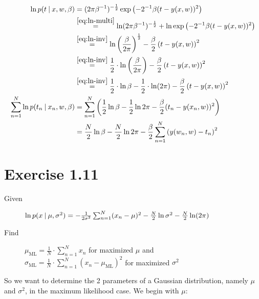 \documentclass[a4paper]{article}
\newcommand\given{
  \nonscript\:
  \vert
  \nonscript\:
  \mathopen{}
  \allowbreak
}
\begin{document}
\begin{align}
  \ln{p(t \given x,w,\beta)} &= (2 \pi \beta^{-1})^{-\frac12} \exp\left(-2^{-1} \beta (t - y(x,w))^2\right) \\
      &\overset{\eqref{eq:ln-multi}}{=} \ln(2 \pi \beta^{-1})^{-\frac12} + \ln\exp\left(-2^{-1} \beta (t - y(x,w))^2\right) \\
      &\overset{\eqref{eq:ln-inv}}{=} \ln\left(\frac{\beta}{2\pi}\right)^{\frac12} - \frac{\beta}{2}\left(t - y(x,w)\right)^2 \\
      &\overset{\eqref{eq:ln-inv}}{=} \frac12 \cdot \ln\left(\frac{\beta}{2\pi}\right) - \frac{\beta}{2}\left(t - y(x,w)\right)^2 \\
      &\overset{\eqref{eq:ln-inv}}{=} \frac12 \cdot \ln \beta - \frac12 \cdot \ln(2\pi) - \frac{\beta}{2}\left(t - y(x,w)\right)^2 \\
  \sum_{n=1}^N \ln{p(t_n \given x_n,w,\beta)} &= \sum_{n=1}^N \left(\frac12 \ln{\beta} - \frac12 \ln{2\pi} - \frac\beta2 (t_n - y(x_n, w))^2\right) \\
      &= \frac{N}{2} \ln\beta - \frac{N}{2} \ln{2\pi} - \frac{\beta}{2} \sum_{n=1}^N \left(y(w_n, w) - t_n\right)^2
\end{align}

\section{Exercise 1.11}

\begin{description}
  \item[Given] $\ln{p(x \given \mu, \sigma^2)} = -\frac1{2\sigma^2} \sum_{n=1}^N (x_n - \mu)^2 - \frac{N}{2} \ln{\sigma^2} - \frac{N}{2} \ln(2\pi)$
  \item[Find] $\mu_{\text{ML}} = \frac{1}{N} \cdot \sum_{n=1}^N x_n$ for maximized $\mu$ and \\
    $\sigma_{\text{ML}} = \frac{1}{N}\cdot \sum_{n=1}^N (x_n - \mu_{\text{ML}})^2$ for maximized $\sigma^2$
\end{description}

So we want to determine the 2 parameters of a Gaussian distribution, namely $\mu$ and $\sigma^2$, in the maximum likelihood case.
We begin with $\mu$:
\end{document}
